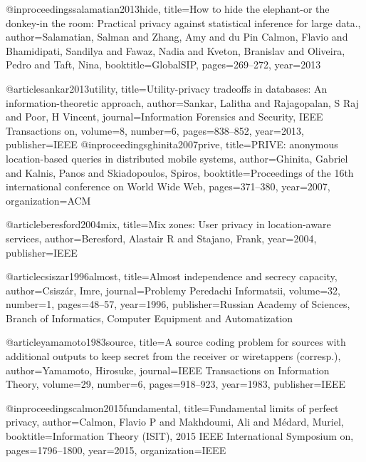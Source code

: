 {{{{{{@inproceedings{salamatian2013hide,
	title={How to hide the elephant-or the donkey-in the room: Practical privacy against statistical inference for large data.},
	author={Salamatian, Salman and Zhang, Amy and du Pin Calmon, Flavio and Bhamidipati, Sandilya and Fawaz, Nadia and Kveton, Branislav and Oliveira, Pedro and Taft, Nina},
	booktitle={GlobalSIP},
	pages={269--272},
	year={2013}
}

@article{sankar2013utility,
	title={Utility-privacy tradeoffs in databases: An information-theoretic approach},
	author={Sankar, Lalitha and Rajagopalan, S Raj and Poor, H Vincent},
	journal={Information Forensics and Security, IEEE Transactions on},
	volume={8},
	number={6},
	pages={838--852},
	year={2013},
	publisher={IEEE}
}
@inproceedings{ghinita2007prive,
	title={PRIVE: anonymous location-based queries in distributed mobile systems},
	author={Ghinita, Gabriel and Kalnis, Panos and Skiadopoulos, Spiros},
	booktitle={Proceedings of the 16th international conference on World Wide Web},
	pages={371--380},
	year={2007},
	organization={ACM}
}

@article{beresford2004mix,
	title={Mix zones: User privacy in location-aware services},
	author={Beresford, Alastair R and Stajano, Frank},
	year={2004},
	publisher={IEEE}
}


@article{csiszar1996almost,
	title={Almost independence and secrecy capacity},
	author={Csisz{\'a}r, Imre},
	journal={Problemy Peredachi Informatsii},
	volume={32},
	number={1},
	pages={48--57},
	year={1996},
	publisher={Russian Academy of Sciences, Branch of Informatics, Computer Equipment and Automatization}
}

@article{yamamoto1983source,
	title={A source coding problem for sources with additional outputs to keep secret from the receiver or wiretappers (corresp.)},
	author={Yamamoto, Hirosuke},
	journal={IEEE Transactions on Information Theory},
	volume={29},
	number={6},
	pages={918--923},
	year={1983},
	publisher={IEEE}
}


@inproceedings{calmon2015fundamental,
	title={Fundamental limits of perfect privacy},
	author={Calmon, Flavio P and Makhdoumi, Ali and M{\'e}dard, Muriel},
	booktitle={Information Theory (ISIT), 2015 IEEE International Symposium on},
	pages={1796--1800},
	year={2015},
	organization={IEEE}
}



}}}}}}

